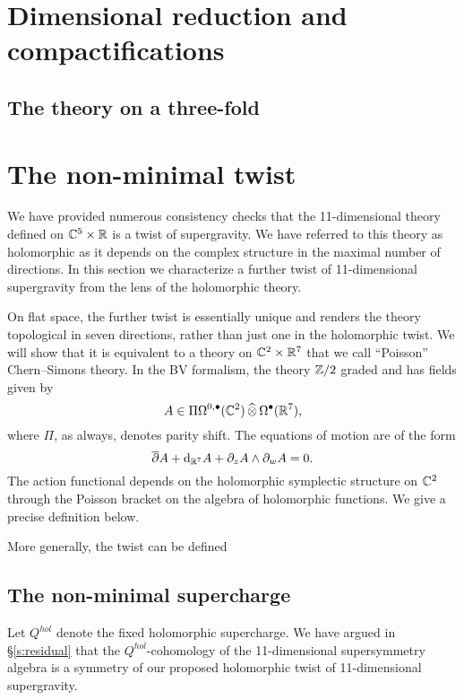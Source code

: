 \documentclass[11pt]{amsart}
\begin{document}

\section{Dimensional reduction and compactifications} 


\subsection{The theory on a three-fold}


\section{The non-minimal twist} 

We have provided numerous consistency checks that the 11-dimensional theory defined on $\mathbb C^5 \times \mathbb R$ is a twist of supergravity. 
We have referred to this theory as holomorphic as it depends on the complex structure in the maximal number of directions. 
In this section we characterize a further twist of 11-dimensional supergravity from the lens of the holomorphic theory. 

On flat space, the further twist is essentially unique and renders the theory topological in seven directions, rather than just one in the holomorphic twist. 
We will show that it is equivalent to a theory on $\mathbb C^2 \times \mathbb R^7$ that we call ``Poisson'' Chern--Simons theory. 
In the BV formalism, the theory $\mathbb Z/2$ graded and has fields given by
\[
A \in \Pi \Omega^{0,\bullet}(\mathbb C^2) \, \widehat{\otimes} \, \Omega^\bullet(\mathbb R^7) ,
\]
where $\Pi$, as always, denotes parity shift.
The equations of motion are of the form
\[
\overline{\partial} A + {\rm d}_{\mathbb R^7} A + \partial_{z} A \wedge \partial_{w} A = 0 .
\]
The action functional depends on the holomorphic symplectic structure on $\mathbb C^2$ through the Poisson bracket on the algebra of holomorphic functions.
We give a precise definition below. 

More generally, the twist can be defined 


\subsection{The non-minimal supercharge}

Let $Q^{hol}$ denote the fixed holomorphic supercharge. 
We have argued in \S \ref{s:residual} that the $Q^{hol}$-cohomology of the 11-dimensional supersymmetry algebra is a symmetry of our proposed holomorphic twist of 11-dimensional supergravity. 
\end{document}
